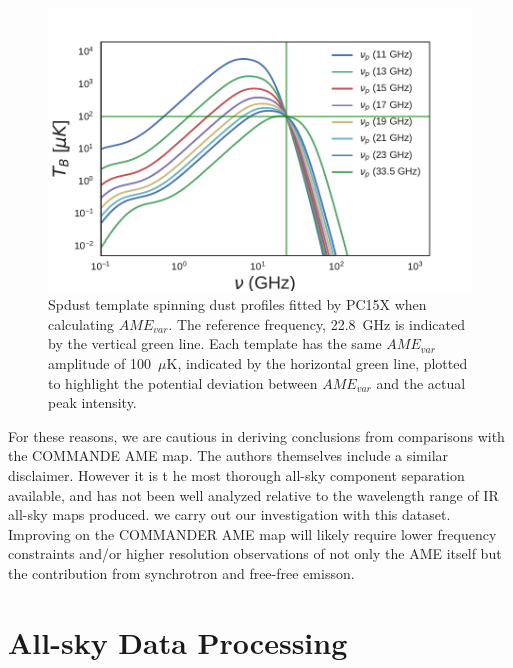         \begin{figure}
          \includegraphics[width=\textwidth]{../Plots/ch_datasources/AME_commander_freqshift_templ.pdf}
          \centering
          \caption{Spdust template spinning dust profiles fitted by PC15X when calculating $AME_{var}$.  The reference frequency, 22.8~GHz is indicated by the vertical green line. Each template has the same $AME_{var}$ amplitude of 100~$\mu$K, indicated by the horizontal green line, plotted to highlight the potential deviation between $AME_{var}$ and the actual peak intensity. }
          \label{fig:AME_commander_freqshift_templ}
      \end{figure}

        For these reasons, we are cautious in deriving conclusions from comparisons with the COMMANDE AME map. The authors themselves include a similar disclaimer. However it is t he most thorough all-sky component separation available, and has not been well analyzed relative to the wavelength range of IR all-sky maps produced. we carry out our investigation with this dataset. Improving on the COMMANDER AME map will likely require lower frequency constraints and/or higher resolution observations of not only the AME itself but the contribution from synchrotron and free-free emisson.

  \section{All-sky Data Processing}

